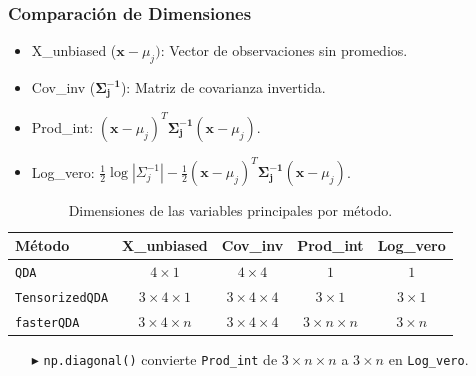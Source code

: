 \begin{frame}
  \frametitle{Comparación de Dimensiones}

  \begin{itemize}
    \item X\_unbiased (\(\mathbf{x} - \mu_j)\): Vector de observaciones sin promedios.
    \item Cov\_inv (\(\mathbf{\Sigma_j^{-1}}\)): Matriz de covarianza invertida.
    \item Prod\_int: \((\mathbf{x} - \mu_j)^T \mathbf{\Sigma_j^{-1}} (\mathbf{x} - \mu_j)\).
    \item Log\_vero: \( \frac{1}{2} \log{\left|\Sigma_j^{-1}\right|} - \frac{1}{2} (\mathbf{x} - \mu_j)^T \mathbf{\Sigma_j^{-1}} (\mathbf{x} - \mu_j)\).


  \end{itemize}

  \begin{table}[h!]
    \centering
    \begin{tabular}{@{}lcccc@{}}
      \toprule
      \textbf{Método}     		  & X\_unbiased 				 	&Cov\_inv 				 & Prod\_int				& 	 Log\_vero		 	 \\ 
      \midrule
      \texttt{QDA}         		 & \(4 \times 1\)              		    & \(4 \times 4\)           		 & \(1\)            			& 	 \cellcolor{yellow}\(1\)				 \\ 
      \texttt{TensorizedQDA}	 & \(3 \times 4 \times 1\)           & \(3 \times 4 \times 4\)     & \(3 \times 1 \)		 	& 	\cellcolor{yellow} \(3 \times 1\)		\\ 
      \texttt{fasterQDA}  	  	 & \(3 \times 4 \times n\)           & \(3 \times 4 \times 4\)     &  \cellcolor{yellow} \(3 \times n \times n\) & 	\cellcolor{yellow}\(3 \times n \) 		\\ 
      \bottomrule
    \end{tabular}
    \caption{Dimensiones de las variables principales por método.}
  \end{table}

  \begin{itemize}
    \item[$\blacktriangleright$]\texttt{np.diagonal()} convierte \texttt{Prod\_int} de \(3 \times n \times n\) a \(3 \times n\) en \texttt{Log\_vero}.
  \end{itemize}

\end{frame}

